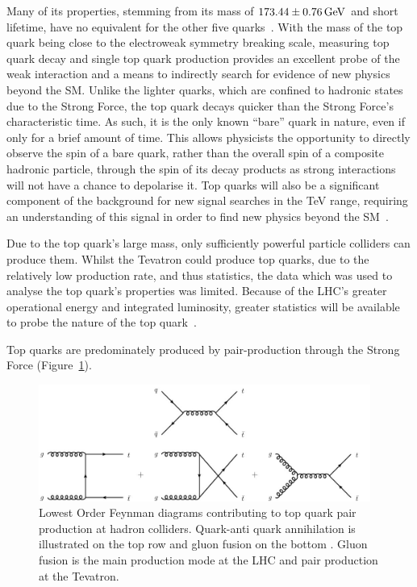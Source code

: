 Many of its properties, stemming from its mass  of $173.44 \pm 0.76 \,\text{Ge\hspace{-.08em}V}$ and short lifetime, have no equivalent for the other five quarks~\cite{LHC:2014combination}. 
With the mass of the top quark being close to the electroweak symmetry breaking scale, measuring top quark decay and single top quark production provides an excellent probe of the weak interaction and a means to indirectly search for evidence of new physics beyond the SM. 
Unlike the lighter quarks, which are confined to hadronic states due to the Strong Force, the top quark decays quicker than the Strong Force's characteristic time.
As such, it is the only known ``bare'' quark in nature, even if only for a brief amount of time. 
This allows physicists the opportunity to directly observe the spin of a bare quark, rather than the overall spin of a composite hadronic particle, through the spin of its decay products as strong interactions will not have a chance to depolarise it.
Top quarks will also be a significant component of the background for new signal searches in the TeV range, requiring an understanding of this signal in order to find new physics beyond the SM~\cite{Quadt}.

Due to the top quark's large mass, only sufficiently powerful particle colliders can produce them. 
Whilst the Tevatron could produce top quarks, due to the relatively low production rate, and thus statistics, the data which was used to analyse the top quark's properties was limited.
Because of the LHC’s greater operational energy and integrated luminosity, greater statistics will be available to probe the nature of the top quark~\cite{Shibata:2008sy}. 

Top quarks are predominately produced by pair-production through the Strong Force (Figure~\ref{fig:feyn_ttbar}).

\begin{figure}[htbp]
\begin{center}
\includegraphics[width=0.97\textwidth]{figs/top-physics/ttbar_feyn.jpg}
\caption{Lowest Order Feynman diagrams contributing to top quark pair production at hadron colliders. Quark-anti quark annihilation is illustrated on the top row and gluon fusion on the bottom . Gluon fusion is the main production mode at the LHC and pair production at the Tevatron.}
\label{fig:feyn_ttbar}
\end{center}
\end{figure}

